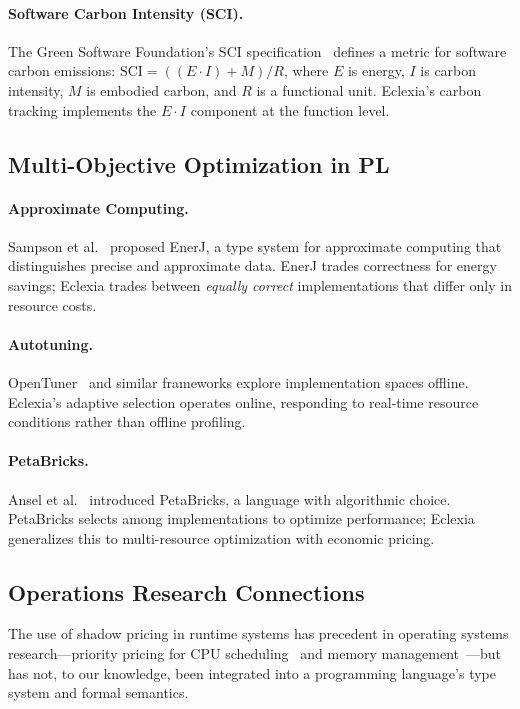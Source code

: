 \documentclass[11pt,a4paper]{article}
\begin{document}
\paragraph{Software Carbon Intensity (SCI).}
The Green Software Foundation's SCI specification~\cite{gsf_sci} defines a
metric for software carbon emissions: $\mathrm{SCI} = ((E \cdot I) + M)
/ R$, where $E$ is energy, $I$ is carbon intensity, $M$ is embodied carbon,
and $R$ is a functional unit.  Eclexia's carbon tracking implements the $E
\cdot I$ component at the function level.

\subsection{Multi-Objective Optimization in PL}

\paragraph{Approximate Computing.}
Sampson et al.~\cite{sampson2011} proposed EnerJ, a type system for
approximate computing that distinguishes precise and approximate data.
EnerJ trades correctness for energy savings; Eclexia trades between
\emph{equally correct} implementations that differ only in resource costs.

\paragraph{Autotuning.}
OpenTuner~\cite{ansel2014} and similar frameworks explore implementation
spaces offline.  Eclexia's adaptive selection operates online, responding to
real-time resource conditions rather than offline profiling.

\paragraph{PetaBricks.}
Ansel et al.~\cite{ansel2009} introduced PetaBricks, a language with
algorithmic choice.  PetaBricks selects among implementations to optimize
performance; Eclexia generalizes this to multi-resource optimization with
economic pricing.

\subsection{Operations Research Connections}

The use of shadow pricing in runtime systems has precedent in operating systems
research---priority pricing for CPU scheduling~\cite{waldspurger1992} and
memory management~\cite{waldspurger2002}---but has not, to our knowledge,
been integrated into a programming language's type system and formal semantics.
\end{document}
